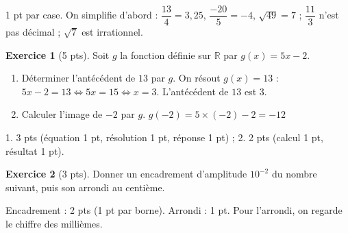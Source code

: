 \documentclass[12pt]{exam}
\theoremstyle{definition}
\newtheorem{exercice}{Exercice}
\begin{document}
\textcolor{sol}{\small 1 pt par case. On simplifie d'abord : $\dfrac{13}{4}=3{,}25$, $\dfrac{-20}{5}=-4$, $\sqrt{49}=7$ ; $\dfrac{11}{3}$ n'est pas décimal ; $\sqrt{7}$ est irrationnel.}
\vfill
\begin{exercice}[5 pts]
Soit $g$ la fonction définie sur $\mathbb{R}$ par $g(x) = 5x-2$.
\begin{enumerate}[label=\arabic*., itemsep=1.2em, topsep=0.6em]
\item Déterminer l'antécédent de $13$ par $g$. \textcolor{sol}{On résout $g(x)=13$ : $5x-2=13 \iff 5x=15 \iff x=3$. L'antécédent de $13$ est $3$.}
\item Calculer l'image de $-2$ par $g$. \hfill \textcolor{sol}{$g(-2)=5\times(-2)-2=-12$} \hspace*{1cm}
\end{enumerate}
\textcolor{sol}{\small 1. 3 pts (équation 1 pt, résolution 1 pt, réponse 1 pt) ; 2. 2 pts (calcul 1 pt, résultat 1 pt).}
\end{exercice}

\vfill
\begin{exercice}[3 pts]
Donner un encadrement d'amplitude $10^{-2}$ du nombre suivant, puis son arrondi au centième.
\par\smallskip\noindent{}\par
\end{exercice}

\textcolor{sol}{\small Encadrement : 2 pts (1 pt par borne). Arrondi : 1 pt. Pour l'arrondi, on regarde le chiffre des millièmes.}

\vfill
\end{document}
